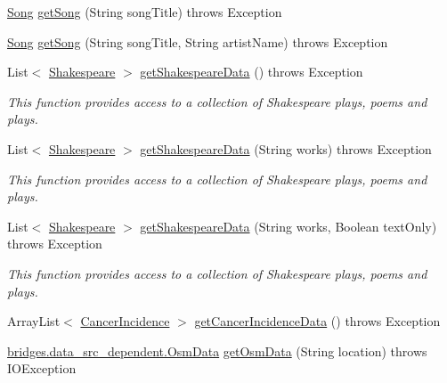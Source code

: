 \begin{DoxyCompactItemize}
\item 
\hyperlink{classbridges_1_1data__src__dependent_1_1_song}{Song} \hyperlink{classbridges_1_1connect_1_1_data_source_a4f49b088703c74d68bd854d40edc5ad4}{get\+Song} (String song\+Title)  throws Exception 
\item 
\hyperlink{classbridges_1_1data__src__dependent_1_1_song}{Song} \hyperlink{classbridges_1_1connect_1_1_data_source_a935ea2005b7de3cb22c1e55027b81460}{get\+Song} (String song\+Title, String artist\+Name)  throws Exception 
\item 
List$<$ \hyperlink{classbridges_1_1data__src__dependent_1_1_shakespeare}{Shakespeare} $>$ \hyperlink{classbridges_1_1connect_1_1_data_source_af2b6e5df074d0a689e8a992b1bea6f3e}{get\+Shakespeare\+Data} ()  throws Exception 
\begin{DoxyCompactList}\small\item\em This function provides access to a collection of Shakespeare plays, poems and plays. \end{DoxyCompactList}\item 
List$<$ \hyperlink{classbridges_1_1data__src__dependent_1_1_shakespeare}{Shakespeare} $>$ \hyperlink{classbridges_1_1connect_1_1_data_source_a04aa757c45139e52525d4b09156abfe1}{get\+Shakespeare\+Data} (String works)  throws Exception 
\begin{DoxyCompactList}\small\item\em This function provides access to a collection of Shakespeare plays, poems and plays. \end{DoxyCompactList}\item 
List$<$ \hyperlink{classbridges_1_1data__src__dependent_1_1_shakespeare}{Shakespeare} $>$ \hyperlink{classbridges_1_1connect_1_1_data_source_abf8e8f8ff3eb14fa6c6b5ce6b48dbadb}{get\+Shakespeare\+Data} (String works, Boolean text\+Only)  throws Exception 
\begin{DoxyCompactList}\small\item\em This function provides access to a collection of Shakespeare plays, poems and plays. \end{DoxyCompactList}\item 
Array\+List$<$ \hyperlink{classbridges_1_1data__src__dependent_1_1_cancer_incidence}{Cancer\+Incidence} $>$ \hyperlink{classbridges_1_1connect_1_1_data_source_a320ce56eeb655c54c0fbed455e0d9f5e}{get\+Cancer\+Incidence\+Data} ()  throws Exception 
\item 
\hyperlink{classbridges_1_1data__src__dependent_1_1_osm_data}{bridges.\+data\+\_\+src\+\_\+dependent.\+Osm\+Data} \hyperlink{classbridges_1_1connect_1_1_data_source_a61c6282b6d25d30f76a7540bf21c0873}{get\+Osm\+Data} (String location)  throws I\+O\+Exception 

\end{DoxyCompactItemize}
